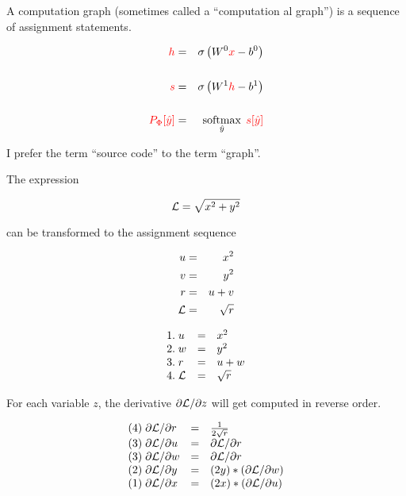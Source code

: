 {A computation graph (sometimes called a ``computation{\color{red} al} graph'') is a sequence of assignment statements.


\begin{eqnarray*}
  {\color{red} h} & = & \sigma\left(W^0{\color{red} x} - b^0\right) \\
  \\
  {\color{red} s} & = & \sigma\left(W^1{\color{red} h} - b^1 \right) \\
  \\
  {\color{red} P_\Phi[\hat{y}]} & = & \operatorname*{softmax}_{\hat{y}}\;{\color{red} s[\hat{y}]}
\end{eqnarray*}

\vfill
I prefer the term ``source code'' to the term ``graph''.


The expression

\vfill
{\color{red} $${\cal L} = \sqrt{x^2 + y^2}$$}

\vfill
can be transformed to the assignment sequence

{\color{red}
\vfill
\begin{eqnarray*}
  u & = & x^2  \\
  v & = & y^2 \\
  r & =& u + v \\
  {\cal L} & = & \sqrt{r}
\end{eqnarray*}
}

\vspace{-1ex}
{\color{red}
$$\begin{array}{lcl}
 1.\;u & = & x^2  \\
 2.\;w & = & y^2 \\
 3.\;r & =& u + w \\
  4.\;{\cal L} & = & \sqrt{r}
\end{array}$$
}

\vfill
For each variable $z$, the derivative $\partial {\cal L}/\partial z$ will get computed in reverse order.

\vfill
{\color{red}
$$\begin{array}{lcl}
(4)\; \partial{\cal L}/\partial r & = & \frac{1}{2\sqrt{r}} \\
(3)\; \partial{\cal L}/\partial u & = & \partial {\cal L}/\partial r \\
(3)\; \partial{\cal L}/\partial w & = & \partial {\cal L}/\partial r\\
(2)\; \partial{\cal L}/\partial y & = &  (2y) * (\partial {\cal L}/\partial w) \\
(1)\; \partial{\cal L}/\partial x & = & (2x) * (\partial {\cal L}/\partial u)
\end{array}$$
}

}
